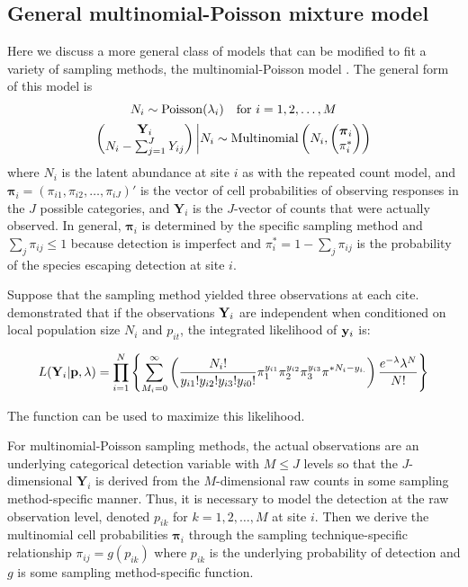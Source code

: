 \documentclass[article,shortnames]{jss}
\DeclareMathOperator{\Poi}{Poisson}
\DeclareMathOperator{\MN}{Multinomial}
\begin{document}
\subsection{General multinomial-Poisson mixture model}
\label{sec:gener-mult-poiss}
Here we discuss a more general class of models that can be modified to fit a
variety of sampling methods, the multinomial-Poisson model
\citep{Royle2004a}.  The general form of this model is
\begin{gather}
  N_i \sim \Poi(\lambda_i) \text{\quad for $i=1,2,\dots,M$} \label{eq:mp2} \\
  \begin{pmatrix}
    \mathbf Y_i\\
    N_{i} - \sum_{j=1}^{J} Y_{ij}
  \end{pmatrix}
  \bigg| N_{i} \sim \MN\left(N_i, 
  \begin{pmatrix}
    \boldsymbol \pi_i \\
    \pi_{i}^{*}
  \end{pmatrix}\right)
\end{gather}
where $N_i$ is the latent abundance at site $i$ as with the repeated
count model, and $\boldsymbol \pi_i=(\pi_{i1},\pi_{i2},\dots,\pi_{iJ})'$ is
the vector of cell probabilities of observing responses in the $J$
possible categories, and $\mathbf Y_{i}$ is the $J$-vector of counts
that were actually observed.  In general, $\boldsymbol \pi_i$ is
determined by the specific sampling method and
$\sum_{j} \pi_{ij} \le 1$ because detection is imperfect and
$\pi_{i}^{*}=1 - \sum_{j} \pi_{ij}$ is the probability of the species
escaping detection at site $i$.  

Suppose that the sampling method yielded three observations at each cite.  
\citet{Royle2004a} demonstrated that if the observations ${\bf Y}_i$ are 
independent when conditioned on local population size $N_i$ and $p_{it}$, the 
integrated likelihood of ${\bf y}_{i}$ is:

\begin{equation}
L({\bf Y}_i| {\bf p},\lambda) = 
 \prod_{i=1}^{N} \left\{ 
  \sum_{M_{i}=0}^{\infty} \left(
 \frac{N_{i}!}{ y_{i1}! y_{i2}! y_{i3}! y_{i0}!}
  \pi_{1}^{y_{i1}}
  \pi_{2}^{y_{i2}}
  \pi_{3}^{y_{i3}}
  \pi^{*N_{i}- y_{i.}} \right)
 \frac{e^{-\lambda} \lambda^N}{N!} \right\}
\end{equation}

The function  can be used to maximize this likelihood.

For multinomial-Poisson sampling methods, the actual observations are
an underlying categorical detection variable with $M \leq J$ levels so
that the $J$-dimensional $\mathbf Y_{i}$ is derived from the
$M$-dimensional raw counts in some sampling method-specific manner.
Thus, it is necessary to model the detection at the raw observation
level, denoted $p_{ik}$ for $k=1,2,\dots,M$ at site $i$.  Then we
derive the multinomial cell probabilities $\boldsymbol \pi_{i}$
through the sampling technique-specific relationship
$\pi_{ij}=g(p_{ik})$ where $p_{ik}$ is the underlying probability of
detection and $g$ is some sampling method-specific function.  
\end{document}
